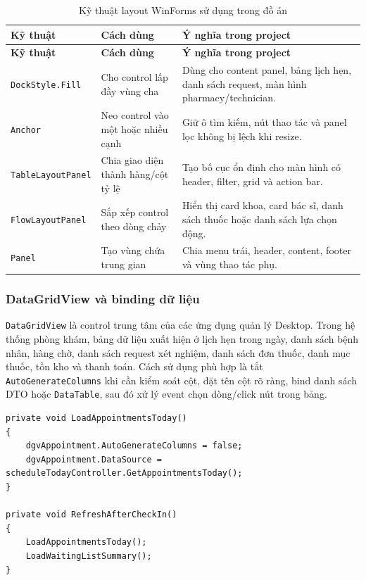 \documentclass[12pt,a4paper]{article}
\numberwithin{figure}{subsection}
\numberwithin{table}{subsection}
\newcounter{codecounter}
\newenvironment{codeblock}[2]{%
    \refstepcounter{codecounter}%
    \phantomsection%
    \label{#1}%
    \par\smallskip
}{%
    \par\smallskip
}
\begin{document}
\begin{longtable}{|p{3.2cm}|p{5cm}|p{5.5cm}|}
\caption{Kỹ thuật layout WinForms sử dụng trong đồ án} \\
\hline
\textbf{Kỹ thuật} & \textbf{Cách dùng} & \textbf{Ý nghĩa trong project} \\
\hline
\endfirsthead
\hline
\textbf{Kỹ thuật} & \textbf{Cách dùng} & \textbf{Ý nghĩa trong project} \\
\hline
\endhead
\texttt{DockStyle.Fill} & Cho control lấp đầy vùng cha & Dùng cho content panel, bảng lịch hẹn, danh sách request, màn hình pharmacy/technician. \\
\hline
\texttt{Anchor} & Neo control vào một hoặc nhiều cạnh & Giữ ô tìm kiếm, nút thao tác và panel lọc không bị lệch khi resize. \\
\hline
\texttt{TableLayoutPanel} & Chia giao diện thành hàng/cột tỷ lệ & Tạo bố cục ổn định cho màn hình có header, filter, grid và action bar. \\
\hline
\texttt{FlowLayoutPanel} & Sắp xếp control theo dòng chảy & Hiển thị card khoa, card bác sĩ, danh sách thuốc hoặc danh sách lựa chọn động. \\
\hline
\texttt{Panel} & Tạo vùng chứa trung gian & Chia menu trái, header, content, footer và vùng thao tác phụ. \\
\hline
\end{longtable}

\subsubsection{DataGridView và binding dữ liệu}

\texttt{DataGridView} là control trung tâm của các ứng dụng quản lý Desktop. Trong hệ thống phòng khám, bảng dữ liệu xuất hiện ở lịch hẹn trong ngày, danh sách bệnh nhân, hàng chờ, danh sách request xét nghiệm, danh sách đơn thuốc, danh mục thuốc, tồn kho và thanh toán. Cách sử dụng phù hợp là tắt \texttt{AutoGenerateColumns} khi cần kiểm soát cột, đặt tên cột rõ ràng, bind danh sách DTO hoặc \texttt{DataTable}, sau đó xử lý event chọn dòng/click nút trong bảng.

\begin{codeblock}{code:datagridview-binding}{Bind dữ liệu vào DataGridView}
\begin{verbatim}
private void LoadAppointmentsToday()
{
    dgvAppointment.AutoGenerateColumns = false;
    dgvAppointment.DataSource = scheduleTodayController.GetAppointmentsToday();
}

private void RefreshAfterCheckIn()
{
    LoadAppointmentsToday();
    LoadWaitingListSummary();
}
\end{verbatim}
\end{codeblock}
\end{document}

